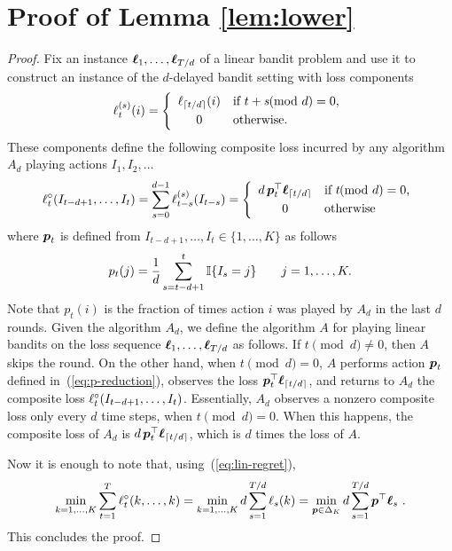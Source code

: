 \section{Proof of Lemma \ref{lem:lower}}

\begin{proof}
Fix an instance $\boldsymbol{\ell}_1,\dots,\boldsymbol{\ell}_{T/d}$ of a linear bandit problem and use it to construct an instance of the $d$-delayed bandit setting with loss components
\[
    \ell_t^{(s)}(i) = \left\{ \begin{array}{cl}
        \ell_{\lceil t/d\rceil}(i) & \text{if $t+s\!\!\!\pmod d=0$,}
    \\[1mm]
        0 & \text{otherwise.}
    \end{array} \right.
\]
These components define the following composite loss incurred by any algorithm $A_d$ playing actions $I_1,I_2,\dots$
\[
    \ell^{\circ}_t(I_{t-d+1},\dots,I_t)
=
    \sum_{s=0}^{d-1} \ell_{t-s}^{(s)}(I_{t-s})
=
    \left\{ \begin{array}{cl}
        d\,\boldsymbol{p}_t^{\top}\boldsymbol{\ell}_{\lceil t/d\rceil} & \text{if $t\!\!\!\pmod d=0$,}
    \\[1mm]
        0 & \text{otherwise}
    \end{array} \right.
\]
where $\boldsymbol{p}_t$ is defined from $I_{t-d+1},\dots,I_t \in \{1,\dots,K\}$ as follows
\begin{equation}
\label{eq:p-reduction}
    p_t(j) = \frac{1}{d}\sum_{s=t-d+1}^t \mathbb{I}{\left\{I_s = j\right\}} \qquad j=1,\dots,K.
\end{equation}
Note that $p_t(i)$ is the fraction of times action $i$ was played by $A_d$ in the last $d$ rounds.
Given the algorithm $A_d$, we define the algorithm $A$ for playing linear bandits on the loss sequence $\boldsymbol{\ell}_1,\dots,\boldsymbol{\ell}_{T/d}$ as follows. If $t\pmod d\neq 0$, then $A$ skips the round. On the other hand, when $t\pmod d=0$, $A$ performs action $\boldsymbol{p}_t$ defined in~(\ref{eq:p-reduction}), observes the loss $\boldsymbol{p}_t^{\top}\boldsymbol{\ell}_{\lceil t/d\rceil}$, and returns to $A_d$ the composite loss $\ell^{\circ}_t(I_{t-d+1},\dots,I_t)$. Essentially, $A_d$ observes a nonzero composite loss only every $d$ time steps, when $t\pmod d=0$. When this happens, the composite loss of $A_d$ is $d\,\boldsymbol{p}_t^{\top}\boldsymbol{\ell}_{\lceil t/d\rceil}$, which is $d$ times the loss of $A$.

Now it is enough to note that, using~(\ref{eq:lin-regret}),
\[
	\min_{k=1,\dots,K} \sum_{t=1}^T \ell^{\circ}_t(k,\dots,k)
=
	\min_{k=1,\dots,K} d \sum_{s=1}^{T/d} \ell_s(k)
=
	\min_{\boldsymbol{p}\in\Delta_K} d \sum_{s=1}^{T/d} \boldsymbol{p}^{\top}\boldsymbol{\ell}_s~.
\]
This concludes the proof.
\end{proof}




